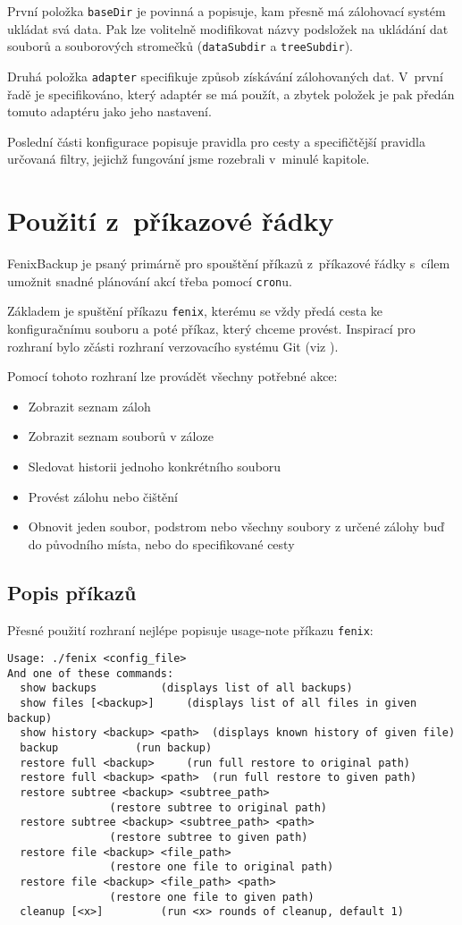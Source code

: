 První položka \texttt{baseDir} je povinná a popisuje, kam přesně má zálohovací
systém ukládat svá data. Pak lze volitelně modifikovat názvy podsložek na
ukládání dat souborů a souborových stromečků (\texttt{dataSubdir}
a \texttt{treeSubdir}).

Druhá položka \texttt{adapter} specifikuje způsob získávání zálohovaných dat.
V~první řadě je specifikováno, který adaptér se má použít, a zbytek položek je
pak předán tomuto adaptéru jako jeho nastavení.

Poslední části konfigurace popisuje pravidla pro cesty a specifičtější pravidla
určovaná filtry, jejichž fungování jsme rozebrali v~minulé kapitole.

\section{Použití z~příkazové řádky}

FenixBackup je psaný primárně pro spouštění příkazů z~příkazové řádky s~cílem
umožnit snadné plánování akcí třeba pomocí \texttt{cron}u.

Základem je spuštění příkazu \texttt{fenix}, kterému se vždy předá cesta ke
konfiguračnímu souboru a poté příkaz, který chceme provést. Inspirací pro
rozhraní bylo zčásti rozhraní verzovacího systému Git (viz \cite{progit}).

Pomocí tohoto rozhraní lze provádět všechny potřebné akce:
\begin{itemize}
	\item Zobrazit seznam záloh
	\item Zobrazit seznam souborů v záloze
	\item Sledovat historii jednoho konkrétního souboru
	\item Provést zálohu nebo čištění
	\item Obnovit jeden soubor, podstrom nebo všechny soubory z určené zálohy
	buď do původního místa, nebo do specifikované cesty
\end{itemize}

\newpage
\subsection{Popis příkazů}

Přesné použití rozhraní nejlépe popisuje usage-note příkazu \texttt{fenix}:
\begin{verbatim}
Usage: ./fenix <config_file>
And one of these commands:
  show backups			(displays list of all backups)
  show files [<backup>]		(displays list of all files in given backup)
  show history <backup> <path>	(displays known history of given file)
  backup			(run backup)
  restore full <backup>		(run full restore to original path)
  restore full <backup> <path>	(run full restore to given path)
  restore subtree <backup> <subtree_path>
				(restore subtree to original path)
  restore subtree <backup> <subtree_path> <path>
				(restore subtree to given path)
  restore file <backup> <file_path>
				(restore one file to original path)
  restore file <backup> <file_path> <path>
				(restore one file to given path)
  cleanup [<x>]			(run <x> rounds of cleanup, default 1)
\end{verbatim}
